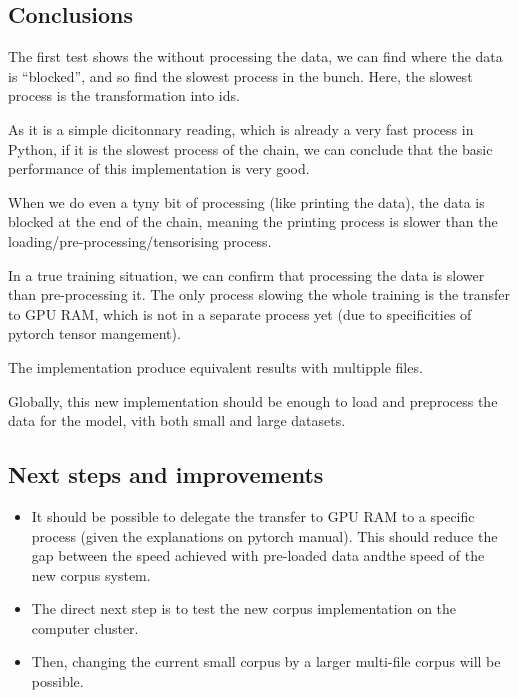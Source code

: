 \subsection{Conclusions}

The first test shows the without processing the data, we can find where
the data is ``blocked'', and so find the slowest process in the bunch.
Here, the slowest process is the transformation into ids.

As it is a simple dicitonnary reading, which is already a very fast
process in Python, if it is the slowest process of the chain, we can
conclude that the basic performance of this implementation is very good.

When we do even a tyny bit of processing (like printing the data), the
data is blocked at the end of the chain, meaning the printing process is
slower than the loading/pre-processing/tensorising process.

In a true training situation, we can confirm that processing the data is
slower than pre-processing it. The only process slowing the whole
training is the transfer to GPU RAM, which is not in a separate process
yet (due to specificities of pytorch tensor mangement).

The implementation produce equivalent results with multipple files.

Globally, this new implementation should be enough to load and
preprocess the data for the model, vith both small and large datasets.

\subsection{Next steps and
improvements}

\begin{itemize}
\item
  It should be possible to delegate the transfer to GPU RAM to a
  specific process (given the explanations on pytorch manual). This
  should reduce the gap between the speed achieved with pre-loaded data
  andthe speed of the new corpus system.
\item
  The direct next step is to test the new corpus implementation on the
  computer cluster.
\item
  Then, changing the current small corpus by a larger multi-file corpus
  will be possible.
\end{itemize}

